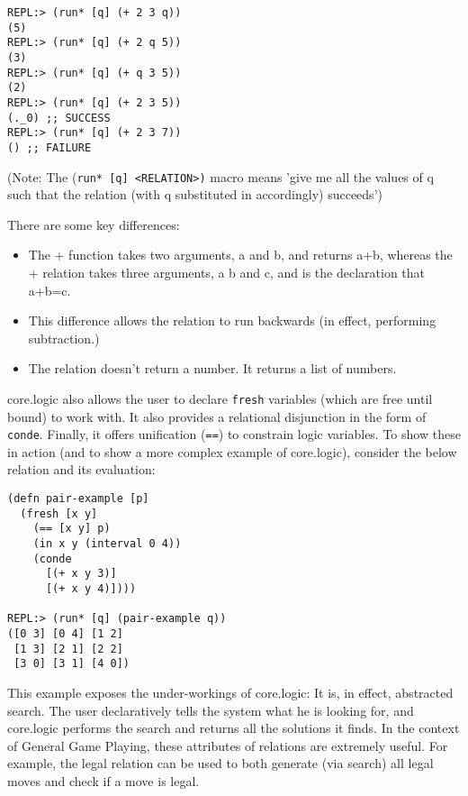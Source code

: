 \documentclass[letterpaper]{article}
\begin{document}
\begin{lstlisting}[frame=single, caption=The + relation]
REPL:> (run* [q] (+ 2 3 q))
(5)
REPL:> (run* [q] (+ 2 q 5))
(3)
REPL:> (run* [q] (+ q 3 5))
(2)
REPL:> (run* [q] (+ 2 3 5))
(._0) ;; SUCCESS
REPL:> (run* [q] (+ 2 3 7))
() ;; FAILURE
\end{lstlisting}

(Note: The (\texttt{run* [q] \textless RELATION\textgreater)} macro means 'give me all the values of q such that the relation (with q substituted in accordingly) succeeds')

There are some key differences:
\begin{itemize}
\item The + function takes two arguments, a and b, and returns a+b, whereas the + relation takes three arguments, a b and c, and is the declaration that a+b=c.
\item This difference allows the relation to run backwards (in effect, performing subtraction.)
\item The relation doesn't return a number. It returns a list of numbers.
\end{itemize}

core.logic also allows the user to declare \texttt{fresh} variables (which are free until bound) to work with. It also provides a relational disjunction in the form of \texttt{conde}. Finally, it offers unification (\texttt{==}) to constrain logic variables. To show these in action (and to show a more complex example of core.logic), consider the below relation and its evaluation:

\begin{lstlisting}[frame=single, caption=Relation to generate all pairs of whole numbers (x y) such that x+y equals 3 or 4]
(defn pair-example [p]
  (fresh [x y]
    (== [x y] p)
    (in x y (interval 0 4))
    (conde
      [(+ x y 3)]
      [(+ x y 4)])))

REPL:> (run* [q] (pair-example q))
([0 3] [0 4] [1 2]
 [1 3] [2 1] [2 2]
 [3 0] [3 1] [4 0])
\end{lstlisting}

This example exposes the under-workings of core.logic: It is, in effect, abstracted search. The user declaratively tells the system what he is looking for, and core.logic performs the search and returns all the solutions it finds. In the context of General Game Playing, these attributes of relations are extremely useful. For example, the legal relation can be used to both generate (via search) all legal moves and check if a move is legal.
\end{document}
